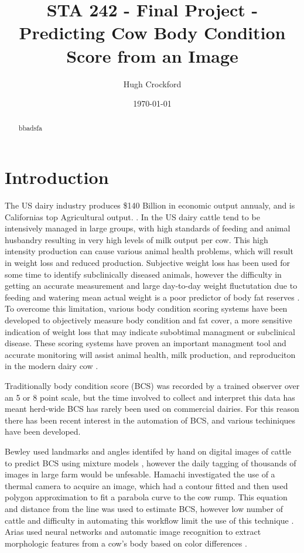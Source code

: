 \documentclass[11pt]{article}
\title{STA 242 - Final Project - Predicting Cow Body Condition Score from an Image}
\author{Hugh Crockford}
\date{\today}
\begin{document}
	\maketitle
	\tableofcontents

	\begin{abstract}
		bbadsfa
	\end{abstract}

\newpage
\section{Introduction}
		The US dairy industry produces \$140 Billion in economic output annualy, and is Californias top Agricultural output. \cite{cmab13}. 
		In the US dairy cattle tend to be intensively managed in large groups, with high standards of feeding and animal husbandry resulting in very high levels of milk output per cow.
		This high intensity production can cause various animal health problems, which will result in weight loss and reduced production.
		Subjective weight loss has been used for some time to identify subclinically diseased animals, however the difficulty in getting an accurate measurement and large day-to-day weight fluctutation due to feeding and watering mean actual weight is a poor predictor of body fat reserves\cite{Roche2004} .
		To overcome this limitation, various body condition scoring systems have been developed to objectively measure body condition and fat cover, a more sensitive indication of weight loss that may indicate subobtimal managment or subclinical disease\cite{Wildman1982}.
		These scoring systems have proven an important managment tool and accurate monitoring will assist animal health, milk production, and reproduciton in the modern dairy cow \cite{Buckley2003}.


		Traditionally body condition score (BCS) was recorded by a trained observer over an 5 or 8 point scale\cite{Bewley2010}, but the time involved to collect and interpret this data has meant herd-wide BCS has rarely been used on commercial dairies.
		For this reason there has been recent interest in the automation of BCS, and various techiniques have been developed.


		Bewley used landmarks and angles identifed by hand on digital images of cattle to predict BCS using mixture models \cite{Bewley2008}, however the daily tagging of thousands of images in large farm would be unfesable.
		Hamachi investigated the use of a thermal camera to acquire an image, which had a contour fitted and then used polygon approximation to fit a parabola curve to the cow rump. This equation and distance from the line was used to estimate BCS, however low number of cattle and difficulty in automating this workflow limit the use of this technique \cite{Halachmi2008}. 
		Arias used neural networks and automatic image recognition to extract morphologic features from a cow's body based on color differences \cite{Arias2004}. 
\end{document}
